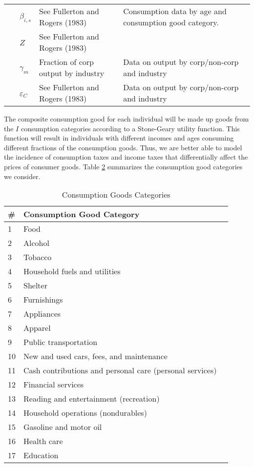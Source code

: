 \documentclass[article,11pt,letterpaper,fleqn]{article}
\theoremstyle{definition}
\numberwithin{equation}{section}
\begin{document}
\begin{landscape}
\begin{table}[htbp]
\begin{tabular}{lll}
    \ \ \ $\beta_{i,s}$ & See Fullerton and Rogers (1983) & Consumption data by age and consumption good category. \\
    \ \ \ $Z$ & See Fullerton and Rogers (1983) &  \\
    \ \ \ $\gamma_{m}$ & Fraction of corp output by industry & Data on output by corp/non-corp and industry \\
    \ \ \ $\varepsilon_{C}$ & See Fullerton and Rogers (1983) & Data on output by corp/non-corp and industry \\
    \hline
    \hline
    \end{tabular}%
  \label{tab:calib_demand}%
\end{table}%
\end{landscape}

The composite consumption good for each individual will be made up goods from the $I$ consumption categories according to a Stone-Geary utility function.  This function will result in individuals with different incomes and ages consuming different fractions of the consumption goods.  Thus, we are better able to model the incidence of consumption taxes and income taxes that differentially affect the prices of consumer goods.  Table \ref{tab:cons_goods} summarizes the consumption good categories we consider.

\begin{table}[htbp]
  \centering
  \caption{Consumption Goods Categories}
    \begin{tabular}{lll}
    \hline
    \hline
   \# & Consumption Good Category \\
    \hline
    1     & Food  \\
    2     & Alcohol \\
    3     & Tobacco \\
    4     & Household fuels and utilities \\
    5     & Shelter \\
    6     & Furnishings \\
    7     & Appliances \\
    8     & Apparel \\
    9     & Public transportation \\
    10    & New and used cars, fees, and maintenance \\
    11    & Cash contributions and personal care (personal services) \\
    12    & Financial services \\
    13    & Reading and entertainment (recreation) \\
    14    & Household operations (nondurables) \\
    15    & Gasoline and motor oil \\
    16    & Health care \\
    17    & Education \\
     \hline
    \hline
    \end{tabular}%
  \label{tab:cons_goods}%
\end{table}%
\end{document}
